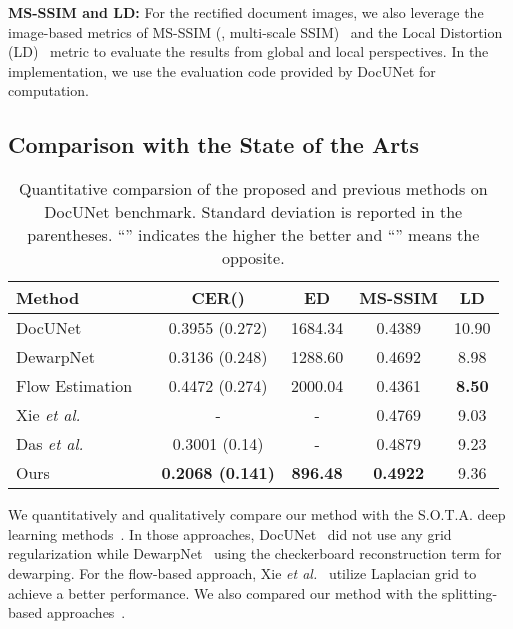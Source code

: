 \documentclass[10pt,twocolumn,letterpaper]{article}
\newcommand{\myparagraph}[1]{\vspace{1pt} \noindent \textbf{#1} }
\begin{document}
\myparagraph{MS-SSIM and LD:} 
For the rectified document images, we also leverage the image-based metrics of MS-SSIM (\ie, multi-scale SSIM)~\cite{wang2004image} and the Local Distortion (LD)~\cite{liu2010sift} metric to evaluate the results from global and local perspectives. In the implementation, we use the evaluation code provided by DocUNet for computation.


\subsection{Comparison with the State of the Arts}

\begin{table}[!t]
  \centering
  \scriptsize
   \caption{Quantitative comparsion of the proposed and previous methods on DocUNet benchmark. Standard deviation is reported in the parentheses. ``'' indicates the higher the better and ``'' means the opposite.}
   \vspace{-3mm}
  \begin{tabular}{lcccc}
    \toprule
    \textbf{Method} &  \textbf{CER}()  & \textbf{ED}  &\textbf{MS-SSIM}  & \textbf{LD} \\
    \midrule
    DocUNet~\cite{Ma_2018_CVPR} & 0.3955 (0.272) & 1684.34  & 0.4389 & 10.90\\
    DewarpNet~\cite{Das_2019_ICCV} & 0.3136 (0.248) & 1288.60 & 0.4692 & 8.98\\  
    Flow Estimation ~\cite{xie2020dewarping} & 0.4472 (0.274) & 2000.04 & 0.4361 & \textbf{8.50} \\ 
    Xie {\em et al.} ~\cite{xie2021document} & -& - &0.4769 & 9.03\\ 
    Das {\em et al.} ~\cite{das2021end} & 0.3001 (0.14) & - & 0.4879 & 9.23\\
    Ours & \textbf{0.2068 (0.141)} & \textbf{896.48} & \textbf{0.4922} & 9.36\\ 
    \bottomrule
  \end{tabular}
  \label{tab:result}
    \vspace{1em}
\end{table}

We quantitatively and qualitatively compare our method with the S.O.T.A. deep learning methods~\cite{Ma_2018_CVPR,Das_2019_ICCV,xie2021document,li2019document,das2021end}. In those approaches, DocUNet~\cite{Ma_2018_CVPR} did not use any grid regularization while DewarpNet~\cite{Das_2019_ICCV} using the checkerboard reconstruction term for dewarping. 
For the flow-based approach, Xie {\em et al.}~\cite{xie2021document} utilize Laplacian grid to achieve a better performance. We also compared our method with the splitting-based approaches~\cite{li2019document,das2021end}.
\end{document}
